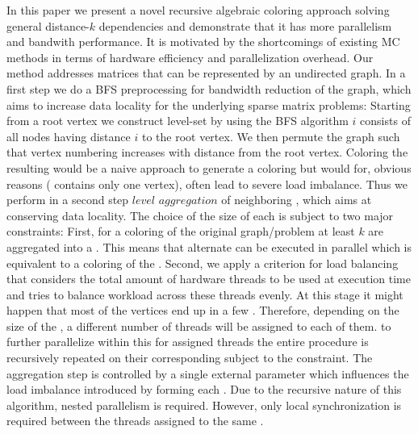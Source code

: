 
In this paper we present a novel recursive algebraic coloring approach solving general distance-$k$ dependencies and demonstrate that it has more parallelism and bandwith performance. It is motivated by the shortcomings of existing \acrshort{MC} methods in terms of hardware efficiency and parallelization overhead. Our method addresses matrices that can be represented by an undirected graph. In a first step we do a \acrlong{BFS} preprocessing for bandwidth reduction of the graph, which aims to increase data locality for the underlying sparse matrix problems: Starting from a root vertex we construct level-set by using the \acrshort{BFS} algorithm \ie \level $i$ consists of all nodes having distance $i$ to the root vertex. We then permute the graph such that vertex numbering increases with distance from the root vertex. Coloring the resulting \levels would be a naive approach to generate a \DK coloring but would for, obvious reasons (\eg {} contains only one vertex), often lead to severe load imbalance. Thus we perform in a second step $level$ $aggregation$ of neighboring \levels, which aims at conserving data locality. The choice of the size of each \levelGroup is subject to two major constraints: First, for a \DK coloring of the original graph/problem at least $k$ \levels are aggregated into a \levelGroup. This means that alternate \levelGroups can be executed in parallel which is equivalent to a \DONE coloring of the \levelGroups. Second, we apply a criterion for load balancing that considers the total amount of hardware threads to be used at execution time and tries to balance workload across these threads evenly. At this stage it might happen that most of the vertices end up in a few \levelGroups. Therefore, depending on the size of the \levelGroups, a different number of threads will be assigned to each of them. \Inorder to further parallelize within this \levelGroup for assigned threads the entire procedure is recursively repeated on their corresponding \subgraphs subject to the \DK constraint. The aggregation step is controlled by a single external parameter which influences the load imbalance introduced by forming each \levelGroup. Due to the recursive nature of this algorithm, nested parallelism is required. However, only local synchronization is required between the threads assigned to the same \subgraph.


